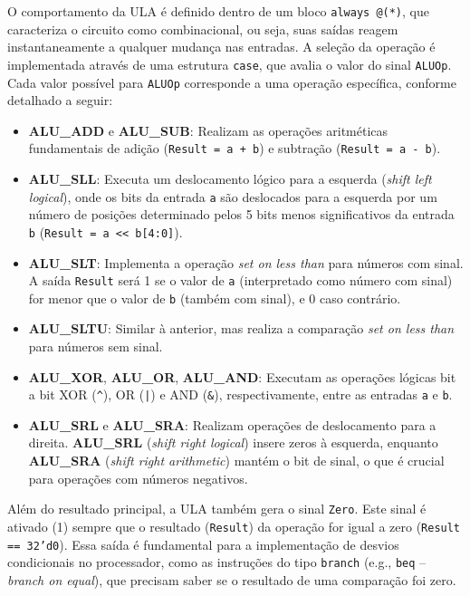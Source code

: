 \documentclass[12pt]{article}
\begin{document}
O comportamento da ULA é definido dentro de um bloco \texttt{always @(*)}, 
que caracteriza o circuito como combinacional, ou seja, 
suas saídas reagem instantaneamente a qualquer mudança nas entradas. 
A seleção da operação é implementada através de uma estrutura \texttt{case}, 
que avalia o valor do sinal \texttt{ALUOp}. 
Cada valor possível para \texttt{ALUOp} corresponde a uma operação específica, conforme detalhado a seguir:

\begin{itemize}
    \item \textbf{ALU\_ADD} e \textbf{ALU\_SUB}: Realizam as operações aritméticas fundamentais de adição 
    (\texttt{Result = a + b}) e subtração (\texttt{Result = a - b}).

    \item \textbf{ALU\_SLL}: Executa um deslocamento lógico para a esquerda (\textit{shift left logical}), 
    onde os bits da entrada \texttt{a} são deslocados para a esquerda por um número de posições 
    determinado pelos 5 bits menos significativos da entrada \texttt{b} 
    (\texttt{Result = a << b[4:0]}).

    \item \textbf{ALU\_SLT}: Implementa a operação \textit{set on less than} para números com sinal. 
    A saída \texttt{Result} será 1 se o valor de \texttt{a} (interpretado como número com sinal) for 
    menor que o valor de \texttt{b} (também com sinal), e 0 caso contrário.

    \item \textbf{ALU\_SLTU}: Similar à anterior, mas realiza a comparação \textit{set on less than} 
    para números sem sinal.

    \item \textbf{ALU\_XOR}, \textbf{ALU\_OR}, \textbf{ALU\_AND}: Executam as operações lógicas 
    bit a bit XOR (\texttt{\^{}}), OR (\texttt{|}) e AND (\texttt{\&}), respectivamente, entre as entradas 
    \texttt{a} e \texttt{b}.

    \item \textbf{ALU\_SRL} e \textbf{ALU\_SRA}: Realizam operações de deslocamento para a direita. 
    \textbf{ALU\_SRL} (\textit{shift right logical}) insere zeros à esquerda, enquanto 
    \textbf{ALU\_SRA} (\textit{shift right arithmetic}) mantém o bit de sinal, 
    o que é crucial para operações com números negativos.
\end{itemize}

Além do resultado principal, a ULA também gera o sinal \texttt{Zero}. 
Este sinal é ativado (1) sempre que o resultado (\texttt{Result}) da operação for igual a zero 
(\texttt{Result == 32'd0}). 
Essa saída é fundamental para a implementação de desvios condicionais no processador, 
como as instruções do tipo \texttt{branch} (e.g., \texttt{beq} -- \textit{branch on equal}), 
que precisam saber se o resultado de uma comparação foi zero.
\end{document}
